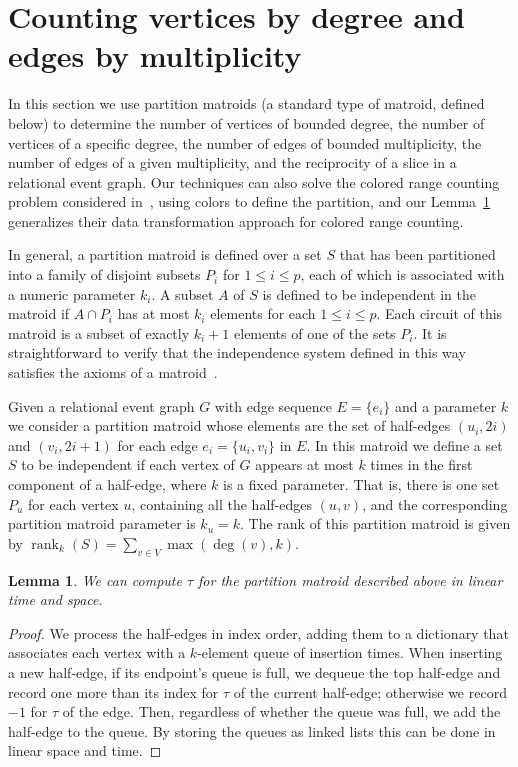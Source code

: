 \documentclass[11pt]{article}
\DeclareMathOperator{\rank}{rank}
\newtheorem{lemma}{Lemma}
\begin{document}
\section{Counting vertices by degree and edges by multiplicity}
In this section we use partition matroids (a standard type of matroid, defined below) to determine the number of vertices of bounded degree, the number of vertices of a specific degree, the number of edges of bounded multiplicity, the number of edges of a given multiplicity, and the reciprocity of a slice in a relational event graph. Our techniques can also solve the colored range counting problem considered in~\cite{ColorRangeQueries}, using colors to define the partition, and our Lemma~\ref{lem:vertex-degree} generalizes their data transformation approach for colored range counting.

In general, a partition matroid is defined over a set $S$ that has been partitioned into a family of disjoint subsets $P_i$ for $1 \leq i \leq p$, each of which is associated with a numeric parameter $k_i$. A subset $A$ of $S$ is defined to be independent in the matroid if $A \cap P_i$ has at most $k_i$ elements for each $1 \leq i \leq p$. Each circuit of this matroid is a subset of exactly $k_i+1$ elements of one of the sets $P_i$. It is straightforward to verify that the independence system defined in this way satisfies the axioms of a matroid~\cite{Welsh10}.

Given a relational event graph $G$ with edge sequence $E = \{ e_i \}$ and a parameter $k$ we consider a partition matroid whose elements are the set of half-edges $(u_i, 2i)$ and $(v_i, 2i + 1)$ for each edge $e_i = \{u_i, v_i\}$ in $E$. In this matroid we define a set $S$ to be independent if each vertex of $G$ appears at most $k$ times in the first component of a half-edge, where $k$ is a fixed parameter. That is, there is one set $P_u$ for each vertex $u$, containing all the half-edges $(u,v)$, and the corresponding partition matroid parameter is $k_u=k$. The rank of this partition matroid is given by $\rank_k(S) = \sum_{v \in V} \max(\deg(v), k).$

\begin{lemma}\label{lem:vertex-degree}
We can compute $\tau$ for the partition matroid described above in linear time and space.
\end{lemma}
\begin{proof}
We process the half-edges in index order, adding them to a dictionary that associates each vertex with a $k$-element queue of insertion times. When inserting a new half-edge, if its endpoint's queue is full, we dequeue the top half-edge and record one more than its index for $\tau$ of the current half-edge; otherwise we record $-1$ for $\tau$ of the edge. Then, regardless of whether the queue was full, we add the half-edge to the queue. By storing the queues as linked lists this can be done in linear space and time.
\end{proof}
\end{document}
